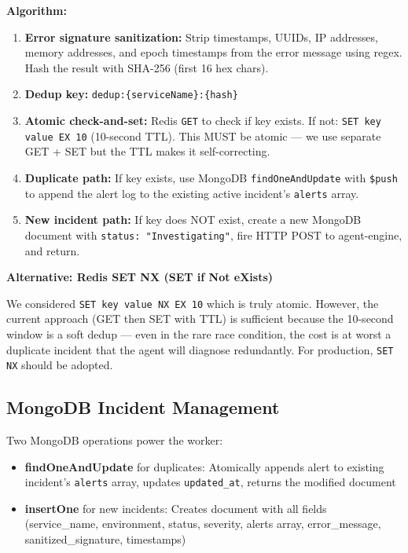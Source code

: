 \documentclass[11pt,a4paper]{article}
\begin{document}
\begin{techbox}
\textbf{Algorithm:}

\begin{enumerate}[leftmargin=*,itemsep=2pt]
  \item \textbf{Error signature sanitization:} Strip timestamps, UUIDs, IP addresses, memory addresses, and epoch timestamps from the error message using regex. Hash the result with SHA-256 (first 16 hex chars).
  \item \textbf{Dedup key:} \texttt{dedup:\{serviceName\}:\{hash\}}
  \item \textbf{Atomic check-and-set:} Redis \texttt{GET} to check if key exists. If not: \texttt{SET key value EX 10} (10-second TTL). This MUST be atomic — we use separate GET + SET but the TTL makes it self-correcting.
  \item \textbf{Duplicate path:} If key exists, use MongoDB \texttt{findOneAndUpdate} with \texttt{\$push} to append the alert log to the existing active incident's \texttt{alerts} array.
  \item \textbf{New incident path:} If key does NOT exist, create a new MongoDB document with \texttt{status: "Investigating"}, fire HTTP POST to agent-engine, and return.
\end{enumerate}
\end{techbox}

\begin{alternativebox}
\textbf{Alternative: Redis SET NX (SET if Not eXists)}

We considered \texttt{SET key value NX EX 10} which is truly atomic. However, the current approach (GET then SET with TTL) is sufficient because the 10-second window is a soft dedup — even in the rare race condition, the cost is at worst a duplicate incident that the agent will diagnose redundantly. For production, \texttt{SET NX} should be adopted.
\end{alternativebox}

\subsection{MongoDB Incident Management}

Two MongoDB operations power the worker:

\begin{itemize}[leftmargin=*,itemsep=4pt]
  \item \textbf{findOneAndUpdate} for duplicates: Atomically appends alert to existing incident's \texttt{alerts} array, updates \texttt{updated\_at}, returns the modified document
  \item \textbf{insertOne} for new incidents: Creates document with all fields (service\_name, environment, status, severity, alerts array, error\_message, sanitized\_signature, timestamps)
\end{itemize}
\end{document}
